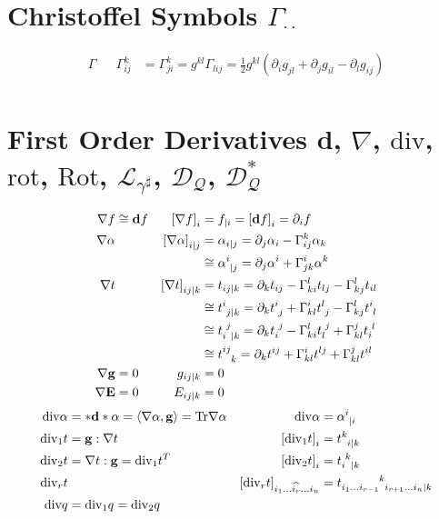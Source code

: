 \documentclass[a4paper,10pt]{scrartcl}
\newcommand{\exd}{\mathbf{d}}
\newcommand{\Tr}{\mathrm{Tr}}
\newcommand{\rot}{\mathrm{rot}}
\renewcommand{\div}{\mathrm{div}}
\newcommand{\Rot}{\mathrm{Rot}}
\newcommand{\lie}{\mathcal{L}}
\newcommand{\dq}{\mathcal{D}_{\mathcal{Q}}}
\newcommand{\gb}{\mathbf{g}}
\newcommand{\Eb}{\mathbf{E}}
\begin{document}
\section{Christoffel Symbols \( \Gamma^{\cdot}_{\cdot\cdot} \)}
\begin{align*}
  \Gamma &&\Gamma^{k}_{ij} &= \Gamma^{k}_{ji} = g^{kl}\Gamma_{lij} = \frac{1}{2}g^{kl}\left( \partial_{i}g_{jl} + \partial_{j}g_{il} - \partial_{l}g_{ij} \right) \\
\end{align*}

\section{First Order Derivatives \( \exd \), \( \nabla \), \( \div \), \( \rot \), \( \Rot \), \( \lie_{\gamma^{\sharp}} \), \( \dq \), \( \dq^{*} \)}
\begin{align*}
  \nabla f &\cong \exd f 
          & \left[ \nabla f \right]_{i} &= f_{|i} = \left[ \exd f \right]_{i} = \partial_{i}f \\
  \nabla \alpha &
          & \left[ \nabla \alpha \right]_{i|j} &= \alpha_{i|j} = \partial_{j}\alpha_{i} - \Gamma^{k}_{ij}\alpha_{k} \\
          &&&\cong \tensor{\alpha}{^{i}_{|j}} = \partial_{j}\alpha^{i} + \Gamma^{i}_{jk}\alpha^{k}\\
  \nabla t &
          & \left[ \nabla t \right]_{ij|k} &= t_{ij|k} = \partial_{k}t_{ij} - \Gamma^{l}_{ki}t_{lj} - \Gamma^{l}_{kj}t_{il} \\
                       &&&\cong \tensor{t}{^{i}_{j|k}} = \partial_{k}\tensor{t}{^{i}_{j}} + \Gamma^{i}_{kl}\tensor{t}{^{l}_{j}} - \Gamma^{l}_{kj}\tensor{t}{^{i}_{l}}\\
                    &&&\cong \tensor{t}{_{i}^{j}_{|k}} = \partial_{k}\tensor{t}{_{i}^{j}} - \Gamma^{l}_{ki}\tensor{t}{_{l}^{j}} + \Gamma^{j}_{kl}\tensor{t}{_{i}^{l}}\\
                       &&&\cong\tensor{t}{^{ij}_{k}}   = \partial_{k}t^{ij} + \Gamma^{i}_{kl}t^{lj} + \Gamma^{j}_{kl}t^{il}\\
  \nabla \gb &= 0 & g_{ij|k} &= 0\\
  \nabla \Eb &= 0 & E_{ij|k} &= 0
\end{align*}
\begin{align*}
  \div\alpha &= *\exd * \alpha = \left\langle \nabla\alpha, \gb \right\rangle = \Tr\nabla\alpha
          &\div\alpha &= \tensor{\alpha}{^{i}_{|i}} \\
  \div_{1}t &= \gb:\nabla t
          & \left[ \div_{1}t \right]_{i} &= \tensor{t}{^{k}_{i|k}}\\
  \div_{2}t &= \nabla t :\gb = \div_{1}t^{T}
          & \left[ \div_{2}t \right]_{i} &= \tensor{t}{_{i}^{k}_{|k}}\\
  \div_{r}t &
          & \left[ \div_{r}t \right]_{i_{1}\ldots \widehat{i_{r}} \ldots i_{n}} &=\tensor{t}{_{i_{1}\ldots i_{r-1}}^{k}_{i_{r+1}\ldots i_{n}|k}} \\
  \div q &= \div_{1}q = \div_{2}q
\end{align*}
\end{document}
